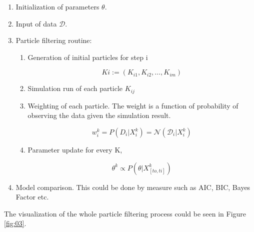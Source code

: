 \documentclass{bioinfo}
\begin{document}
\begin{enumerate}
\item Initialization of parameters $\theta$.
\item Input of data $\mathcal{D}$.
\item Particle filtering routine:

\begin{enumerate}
\item Generation of initial particles for step i

\begin{equation}
Ki := (K_{i1}, K_{i2}, \dots, K_{im})\label{eq:11}
\end{equation}

\item Simulation run of each particle $K_{ij}$
\item Weighting of each particle. The weight is a function of probability of observing the data given the simulation result.

\begin{equation}
w_i^k = P(D_i | X_i^k) = \mathcal{N}(\mathcal{D}_i | X_i^k)\label{eq:12}
\end{equation}

\item Parameter update for every K,

\begin{equation}
\theta^k \propto P(\theta | X^k_{[to, ti]})\label{eq:13}
\end{equation}

\end{enumerate}

\item Model comparison. This could be done by measure such as AIC, BIC, Bayes Factor etc.

\end{enumerate}

The visualization of the whole particle filtering process could be seen in Figure \ref{fig:03}.
\end{document}
